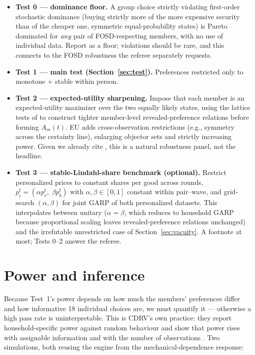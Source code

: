 \documentclass[11pt]{article}
\theoremstyle{remark}
\begin{document}
\begin{itemize}[leftmargin=1.6em]
\item \textbf{Test 0 --- dominance floor.} A group choice strictly violating first-order stochastic dominance (buying strictly more of the more expensive security than of the cheaper one, symmetric equal-probability states) is Pareto dominated for \emph{any} pair of FOSD-respecting members, with no use of individual data. Report as a floor; violations should be rare, and this connects to the FOSD robustness the referee separately requests.
\item \textbf{Test 1 --- main test (Section~\ref{sec:test}).} Preferences restricted only to monotone $+$ stable within person.
\item \textbf{Test 2 --- expected-utility sharpening.} Impose that each member is an expected-utility maximizer over the two equally likely states, using the lattice tests of \citet{polisson2020} to construct tighter member-level revealed-preference relations before forming $A_m(t)$. EU adds cross-observation restrictions (e.g., symmetry across the certainty line), enlarging objector sets and strictly increasing power. Given we already cite \citet{polisson2020}, this is a natural robustness panel, not the headline.
\item \textbf{Test 3 --- stable-Lindahl-share benchmark (optional).} Restrict personalized prices to constant shares per good across rounds, $p^t_i=(\alpha p^t_r,\;\beta p^t_b)$ with $\alpha,\beta\in[0,1]$ constant within pair--wave, and grid-search $(\alpha,\beta)$ for joint GARP of both personalized datasets. This interpolates between unitary ($\alpha=\beta$, which reduces to household GARP because proportional scaling leaves revealed-preference relations unchanged) and the irrefutable unrestricted case of Section~\ref{sec:vacuity}. A footnote at most; Tests 0--2 answer the referee.
\end{itemize}

\section{Power and inference}\label{sec:power}

Because Test~1's power depends on how much the members' preferences differ and how informative 18 individual choices are, we must quantify it --- otherwise a high pass rate is uninterpretable. This is CDRV's own practice: they report household-specific power against random behaviour and show that power rises with assignable information and with the number of observations \citep[Sec.~4.2]{cherchye2011}. Two simulations, both reusing the engine from the mechanical-dependence response:
\end{document}
